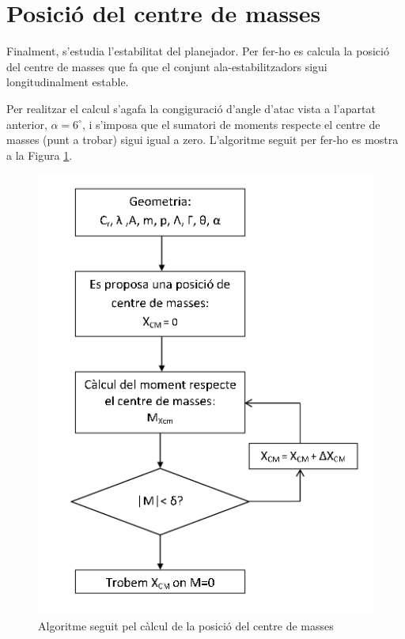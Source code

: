 




 
\section{Posició del centre de masses} 

Finalment, s'estudia l'estabilitat del planejador. Per fer-ho es calcula la posició del centre de masses que fa que el conjunt ala-estabilitzadors sigui longitudinalment estable. 

Per realitzar el calcul s'agafa la congiguració d'angle d'atac vista a l'apartat anterior, $\alpha=6^{\circ}$, i s'imposa que el sumatori de moments respecte el centre de masses (punt a trobar) sigui igual a zero. L'algoritme seguit per fer-ho es mostra a la Figura \ref{AlgoritmeCM}.

\begin{figure}[h]
	\centering
	\includegraphics[scale=0.5]{./plots/algoritmeCM}
	\caption{Algoritme seguit pel càlcul de la posició del centre de masses}
	\label{AlgoritmeCM}
\end{figure}

